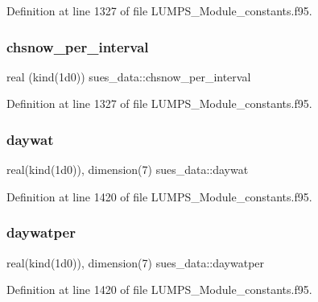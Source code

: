 Definition at line 1327 of file L\+U\+M\+P\+S\+\_\+\+Module\+\_\+constants.\+f95.

\mbox{\label{namespacesues__data_af62ec721dfd084ec5bce9224750e1330}} 
\subsubsection{\texorpdfstring{chsnow\+\_\+per\+\_\+interval}{chsnow\_per\_interval}}
{\footnotesize\ttfamily real (kind(1d0)) sues\+\_\+data\+::chsnow\+\_\+per\+\_\+interval}



Definition at line 1327 of file L\+U\+M\+P\+S\+\_\+\+Module\+\_\+constants.\+f95.

\mbox{\label{namespacesues__data_a55dbeb9abd22aa41d295c4348a2fb6de}} 
\subsubsection{\texorpdfstring{daywat}{daywat}}
{\footnotesize\ttfamily real(kind(1d0)), dimension(7) sues\+\_\+data\+::daywat}



Definition at line 1420 of file L\+U\+M\+P\+S\+\_\+\+Module\+\_\+constants.\+f95.

\mbox{\label{namespacesues__data_aaf929b9a25878b781ca0c2069b3e9468}} 
\subsubsection{\texorpdfstring{daywatper}{daywatper}}
{\footnotesize\ttfamily real(kind(1d0)), dimension(7) sues\+\_\+data\+::daywatper}



Definition at line 1420 of file L\+U\+M\+P\+S\+\_\+\+Module\+\_\+constants.\+f95.

\mbox{\label{namespacesues__data_a6f3357b61d4b1a639e99356c6a49ea6e}} 
